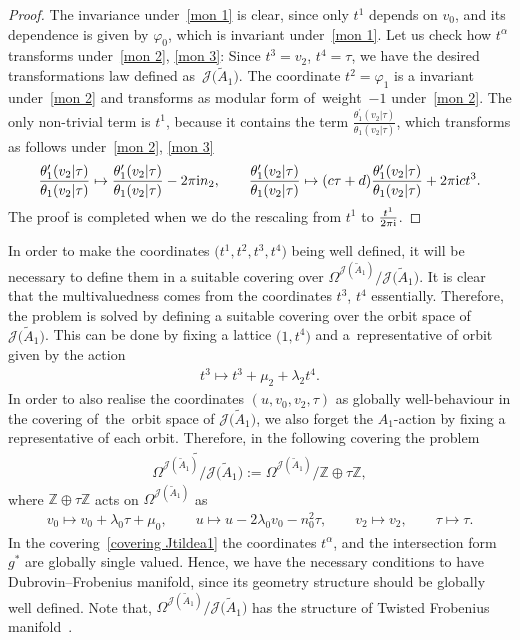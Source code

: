 \documentclass[10pt,a4paper]{amsart}
\numberwithin{equation}{section}
\newcommand{\Ja}{\mathcal{J}}
\begin{document}
\begin{proof}
The invariance under~\eqref{mon 1} is clear, since only $t^1$ depends on $v_0$, and its dependence is given by $\varphi_0$, which is invariant under~\eqref{mon 1}. Let us check how $t^{\alpha}$ transforms under~\eqref{mon 2}, \eqref{mon 3}: Since $t^3=v_2$, $t^4=\tau$, we have the desired transformations law defined as~$\Ja\big(\tilde A_1\big)$. The coordinate $t^2=\varphi_1$ is a invariant under~\eqref{mon 2} and transforms as modular form of~weight~$-1$ under~\eqref{mon 2}. The only non-trivial term is $t^1$, because it contains the term $\frac{\theta_1^{\prime}(v_2|\tau)}{\theta_1(v_2|\tau)}$, which transforms as follows under~\eqref{mon 2}, \eqref{mon 3}~\cite{E.T.WhittakerandG.N.Watson}
\begin{gather*}
\frac{\theta_1^{\prime}(v_2|\tau)}{\theta_1(v_2|\tau)}\mapsto \frac{\theta_1^{\prime}(v_2|\tau)}{\theta_1(v_2|\tau)}-2\pi {\rm i} n_2, \qquad
\frac{\theta_1^{\prime}(v_2|\tau)}{\theta_1(v_2|\tau)}\mapsto (c\tau+d)\frac{\theta_1^{\prime}(v_2|\tau)}{\theta_1(v_2|\tau)} +2\pi {\rm i} ct^3.
\end{gather*}
The proof is completed when we do the rescaling from $t^1$ to $\frac{t^1}{2\pi {\rm i}}$.
\end{proof}

In order to make the coordinates $\big(t^1,t^2,t^3,t^4\big)$ being well defined, it will be necessary to define them in a suitable covering over $\Omega^{\Ja(\tilde A_1)}/\Ja\big(\tilde A_1\big)$. It is clear that the multivaluedness comes from the coordinates $t^3$, $t^4$ essentially. Therefore, the problem is solved by defining a suitable covering over the orbit space of $\Ja\big(\tilde A_1\big)$. This can be done by fixing a lattice $\big(1,t^4\big)$ and a~representative of orbit given by the action
\begin{gather}\label{translation action of v2}
t^3\mapsto t^3+\mu_2+\lambda_2t^4.
\end{gather}
In order to also realise the coordinates $(u,v_0,v_2,\tau)$ as globally well-behaviour in the covering of~the~orbit space of $\Ja\big(\tilde A_1\big)$, we also forget the $A_1$-action by fixing a representative of each orbit. Therefore, in the following covering the problem
\begin{gather}
\label{covering Jtildea1}
\widetilde{\Omega^{\Ja(\tilde A_1)}/\Ja\big(\tilde A_1\big)}:=\Omega^{\Ja(\tilde A_1)}/\mathbb{Z}\oplus\tau\mathbb{Z},
\end{gather}
where $\mathbb{Z}\oplus\tau\mathbb{Z}$ acts on $\Omega^{\Ja(\tilde A_1)}$ as
\begin{gather*}
v_0 \mapsto v_0+\lambda_0\tau+\mu_0,\qquad
u\mapsto u-2\lambda_0v_0-n_0^2\tau,\qquad
v_2\mapsto v_2,\qquad
\tau\mapsto \tau.
\end{gather*}
 In the covering~\eqref{covering Jtildea1} the coordinates $t^{\alpha}$, and the intersection form $g^*$ are globally single valued. Hence, we have the necessary conditions to have Dubrovin--Frobenius manifold, since its geometry structure should be globally well defined. Note that, $\Omega^{\Ja(\tilde A_1)}/\Ja\big(\tilde A_1\big)$ has the structure of Twisted Frobenius manifold~\cite{B.Dubrovin2}.
\end{document}
